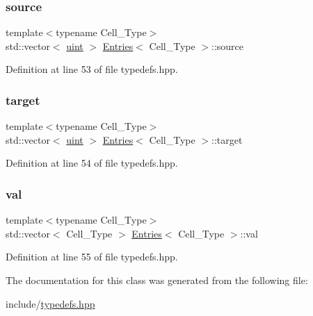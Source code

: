 \subsubsection{\texorpdfstring{source}{source}}
{\footnotesize\ttfamily template$<$typename Cell\+\_\+\+Type$>$ \\
std\+::vector$<$ \hyperlink{typedefs_8hpp_a91ad9478d81a7aaf2593e8d9c3d06a14}{uint} $>$ \hyperlink{class_entries}{Entries}$<$ Cell\+\_\+\+Type $>$\+::source}



Definition at line 53 of file typedefs.\+hpp.

\mbox{\label{class_entries_a02dad3917fa68044b9ea9c60b2909fd7}} 
\subsubsection{\texorpdfstring{target}{target}}
{\footnotesize\ttfamily template$<$typename Cell\+\_\+\+Type$>$ \\
std\+::vector$<$ \hyperlink{typedefs_8hpp_a91ad9478d81a7aaf2593e8d9c3d06a14}{uint} $>$ \hyperlink{class_entries}{Entries}$<$ Cell\+\_\+\+Type $>$\+::target}



Definition at line 54 of file typedefs.\+hpp.

\mbox{\label{class_entries_ae0726e20b17868665cdae6ff70f93bb4}} 
\subsubsection{\texorpdfstring{val}{val}}
{\footnotesize\ttfamily template$<$typename Cell\+\_\+\+Type$>$ \\
std\+::vector$<$ Cell\+\_\+\+Type $>$ \hyperlink{class_entries}{Entries}$<$ Cell\+\_\+\+Type $>$\+::val}



Definition at line 55 of file typedefs.\+hpp.



The documentation for this class was generated from the following file\+:\begin{DoxyCompactItemize}
\item 
include/\hyperlink{typedefs_8hpp}{typedefs.\+hpp}\end{DoxyCompactItemize}
